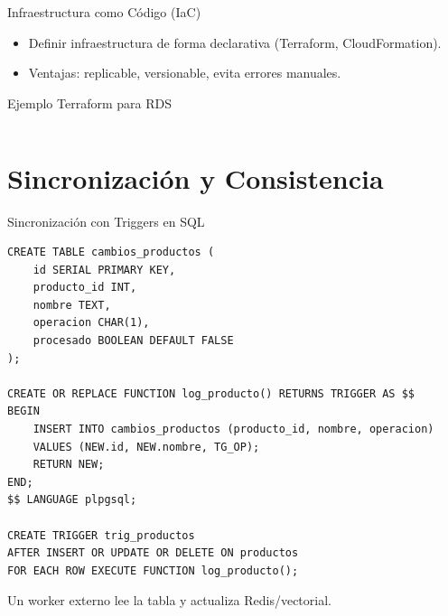 \documentclass[aspectratio=169, 10pt, xcolor=table]{beamer}
\begin{document}
\begin{frame}{Infraestructura como Código (IaC)}
    \begin{itemize}
        \item Definir infraestructura de forma declarativa (Terraform, CloudFormation).
        \item Ventajas: replicable, versionable, evita errores manuales.
    \end{itemize}
    \begin{exampleblock}{Ejemplo Terraform para RDS}
        \begin{lstlisting}[style=bashstyle]

        \end{lstlisting}
    \end{exampleblock}
\end{frame}

\section{Sincronización y Consistencia}

\begin{frame}[fragile]{Sincronización con Triggers en SQL}
    \begin{lstlisting}[style=sqlstyle]
CREATE TABLE cambios_productos (
    id SERIAL PRIMARY KEY,
    producto_id INT,
    nombre TEXT,
    operacion CHAR(1),
    procesado BOOLEAN DEFAULT FALSE
);

CREATE OR REPLACE FUNCTION log_producto() RETURNS TRIGGER AS $$
BEGIN
    INSERT INTO cambios_productos (producto_id, nombre, operacion)
    VALUES (NEW.id, NEW.nombre, TG_OP);
    RETURN NEW;
END;
$$ LANGUAGE plpgsql;

CREATE TRIGGER trig_productos
AFTER INSERT OR UPDATE OR DELETE ON productos
FOR EACH ROW EXECUTE FUNCTION log_producto();
    \end{lstlisting}
    Un worker externo lee la tabla y actualiza Redis/vectorial.
\end{frame}
\end{document}
